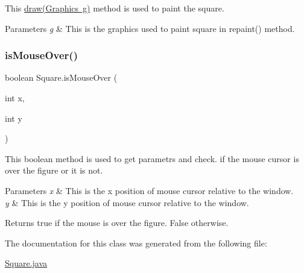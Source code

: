 This \mbox{\hyperlink{class_square_ab19c658492b424933f7faeb5dbed8f3c}{draw(\+Graphics g)}} method is used to paint the square. 
\begin{DoxyParams}{Parameters}
{\em g} & This is the graphics used to paint square in repaint() method. \\
\hline
\end{DoxyParams}
\mbox{\label{class_square_a3b0c67c06fbcb2b6f84699004f5ef0d6}} 
\subsubsection{\texorpdfstring{isMouseOver()}{isMouseOver()}}
{\footnotesize\ttfamily boolean Square.\+is\+Mouse\+Over (\begin{DoxyParamCaption}\item[{int}]{x,  }\item[{int}]{y }\end{DoxyParamCaption})}

This boolean method is used to get parametrs and check. if the mouse cursor is over the figure or it is not. 
\begin{DoxyParams}{Parameters}
{\em x} & This is the x position of mouse cursor relative to the window. \\
\hline
{\em y} & This is the y position of mouse cursor relative to the window. \\
\hline
\end{DoxyParams}
\begin{DoxyReturn}{Returns}
true if the mouse is over the figure. False otherwise. 
\end{DoxyReturn}


The documentation for this class was generated from the following file\+:\begin{DoxyCompactItemize}
\item 
\mbox{\hyperlink{_square_8java}{Square.\+java}}\end{DoxyCompactItemize}
